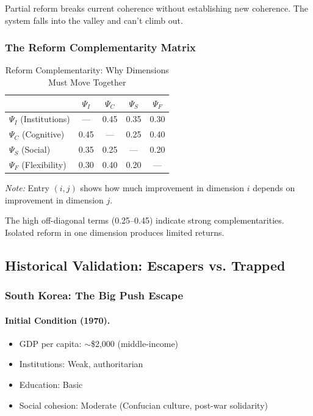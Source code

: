 Partial reform breaks current coherence without establishing new coherence.
The system falls into the valley and can't climb out.

\subsubsection{The Reform Complementarity Matrix}

\begin{table}[htbp]
\centering
\caption{Reform Complementarity: Why Dimensions Must Move Together}
\label{tab:reform-complementarity}
\small
\begin{tabular}{@{}lcccc@{}}
\toprule
& $\Psi_I$ & $\Psi_C$ & $\Psi_S$ & $\Psi_F$ \\
\midrule
$\Psi_I$ (Institutions) & --- & 0.45 & 0.35 & 0.30 \\
$\Psi_C$ (Cognitive) & 0.45 & --- & 0.25 & 0.40 \\
$\Psi_S$ (Social) & 0.35 & 0.25 & --- & 0.20 \\
$\Psi_F$ (Flexibility) & 0.30 & 0.40 & 0.20 & --- \\
\bottomrule
\end{tabular}
\begin{flushleft}
\small\textit{Note:} Entry $(i,j)$ shows how much improvement in dimension $i$ 
depends on improvement in dimension $j$.
\end{flushleft}
\end{table}

The high off-diagonal terms (0.25--0.45) indicate strong complementarities.
Isolated reform in one dimension produces limited returns.

\subsection{Historical Validation: Escapers vs. Trapped}

\subsubsection{South Korea: The Big Push Escape}

\paragraph{Initial Condition (1970).}
\begin{itemize}
    \item GDP per capita: $\sim$\$2,000 (middle-income)
    \item Institutions: Weak, authoritarian
    \item Education: Basic
    \item Social cohesion: Moderate (Confucian culture, post-war solidarity)
\end{itemize}

